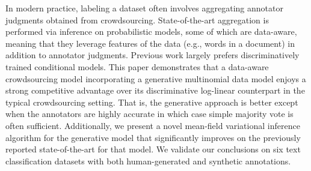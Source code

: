 In modern practice, labeling a dataset often involves aggregating annotator judgments obtained from crowdsourcing. State-of-the-art aggregation is performed via inference on probabilistic models, some of which are data-aware, meaning that they leverage features of the data (e.g., words in a document) in addition to annotator judgments. Previous work largely prefers discriminatively trained conditional models. This paper demonstrates that a data-aware crowdsourcing model incorporating a generative multinomial data model enjoys a strong competitive advantage over its discriminative log-linear counterpart in the typical crowdsourcing setting. That is, the generative approach is better except when the annotators are highly accurate in which case simple majority vote is often sufficient. Additionally, we present a novel mean-field variational inference algorithm for the generative model that significantly improves on the previously reported state-of-the-art for that model. We validate our conclusions on six text classification datasets with both human-generated and synthetic annotations.
